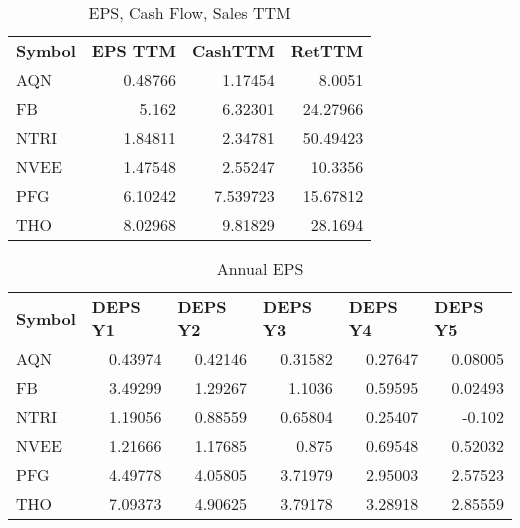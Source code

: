\documentclass{article}
\begin{document}
\begin{table}[htbp]
  \caption{EPS, Cash Flow, Sales TTM}
   \begin{tabular}{lrrr}
    \textbf{Symbol} & \multicolumn{1}{l}{\textbf{EPS TTM}} & \multicolumn{1}{l}{\textbf{CashTTM}} & \multicolumn{1}{l}{\textbf{RetTTM}} \\
    AQN   & 0.48766 & 1.17454 & 8.0051 \\
    FB    & 5.162 & 6.32301 & 24.27966 \\
    NTRI  & 1.84811 & 2.34781 & 50.49423 \\
    NVEE  & 1.47548 & 2.55247 & 10.3356 \\
    PFG   & 6.10242 & 7.539723 & 15.67812 \\
    THO   & 8.02968 & 9.81829 & 28.1694 \\
    \end{tabular}%
  \label{tab:addlabel}%
\end{table}%

\begin{table}[htbp]
  \caption{Annual EPS}
      \begin{tabular}{lrrrrr}
    \textbf{Symbol} & \multicolumn{1}{l}{\textbf{DEPS Y1}} & \multicolumn{1}{l}{\textbf{DEPS Y2}} & \multicolumn{1}{l}{\textbf{DEPS Y3}} & \multicolumn{1}{l}{\textbf{DEPS Y4}} & \multicolumn{1}{l}{\textbf{DEPS Y5}} \\
    AQN   & 0.43974 & 0.42146 & 0.31582 & 0.27647 & 0.08005 \\
    FB    & 3.49299 & 1.29267 & 1.1036 & 0.59595 & 0.02493 \\
    NTRI  & 1.19056 & 0.88559 & 0.65804 & 0.25407 & -0.102 \\
    NVEE  & 1.21666 & 1.17685 & 0.875 & 0.69548 & 0.52032 \\
    PFG   & 4.49778 & 4.05805 & 3.71979 & 2.95003 & 2.57523 \\
    THO   & 7.09373 & 4.90625 & 3.79178 & 3.28918 & 2.85559 \\
    \end{tabular}%
  \label{tab:addlabel}%
\end{table}%
\end{document}
